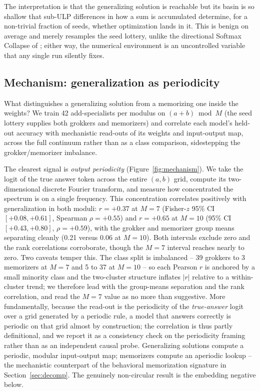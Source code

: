 \documentclass[10pt]{article} %
\begin{document}
The interpretation is that the generalizing solution is reachable but its basin is so shallow that
sub-ULP differences in how a sum is accumulated determine, for a non-trivial fraction of seeds,
whether optimization lands in it. This is benign on average and merely resamples the seed lottery,
unlike the directional Softmax Collapse of \citet{prieto2025edge}; either way, the numerical
environment is an uncontrolled variable that any single run silently fixes.

\subsection{Mechanism: generalization as periodicity}
\label{sec:mechanism}

What distinguishes a generalizing solution from a memorizing one inside the weights? We train 42
add-specialists per modulus on $(a{+}b)\bmod M$ (the seed lottery supplies both grokkers and
memorizers) and correlate each model's held-out accuracy with mechanistic read-outs of its weights
and input-output map, across the full continuum rather than as a class comparison, sidestepping the
grokker/memorizer imbalance.

The clearest signal is \emph{output periodicity} (Figure~\ref{fig:mechanism}). We take the logit of
the true answer token across the entire $(a,b)$ grid, compute its two-dimensional discrete Fourier
transform, and measure how concentrated the spectrum is on a single frequency. This concentration
correlates positively with generalization in both moduli: $r=+0.37$ at $M=7$ (Fisher-$z$ 95\% CI
$[+0.08,+0.61]$, Spearman $\rho=+0.55$) and $r=+0.65$ at $M=10$ (95\% CI $[+0.43,+0.80]$,
$\rho=+0.59$), with the grokker and memorizer group means separating cleanly (0.21 versus 0.06 at
$M=10$). Both intervals exclude zero and the rank correlations corroborate, though the $M=7$
interval reaches nearly to zero. Two caveats temper this. The class split is imbalanced -- 39
grokkers to 3 memorizers at $M=7$ and 5 to 37 at $M=10$ -- so each Pearson $r$ is anchored by a
small minority class and the two-cluster structure inflates $|r|$ relative to a within-cluster
trend; we therefore lead with the group-means separation and the rank correlation, and read the
$M=7$ value as no more than suggestive. More fundamentally, because the read-out is the periodicity of the
\emph{true-answer} logit over a grid generated by a periodic rule, a model that answers correctly is
periodic on that grid almost by construction; the correlation is thus partly definitional, and we
report it as a consistency check on the periodicity framing rather than as an independent causal
probe. Generalizing solutions compute a periodic, modular input-output map; memorizers compute an
aperiodic lookup -- the mechanistic counterpart of the behavioral memorization signature in
Section~\ref{sec:decomp}. The genuinely non-circular result is the embedding negative below.
\end{document}
